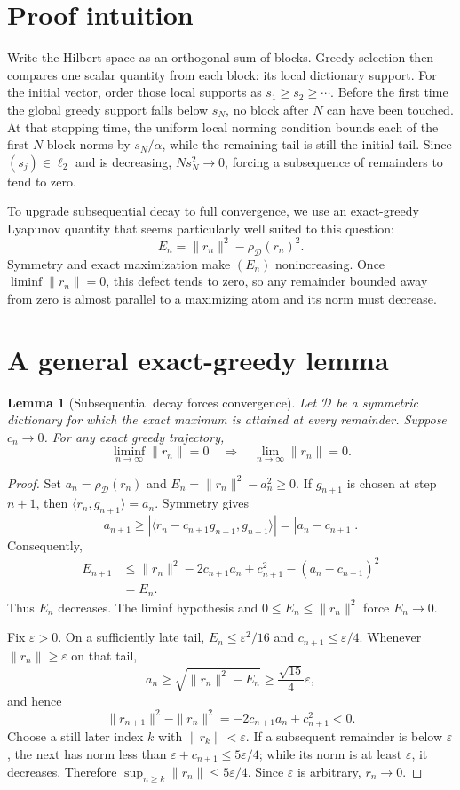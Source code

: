 \documentclass[11pt]{article}
\newtheorem{lemma}[theorem]{Lemma}
\newcommand{\D}{\mathcal D}
\newcommand{\rhoD}{\rho_{\mathcal D}}
\begin{document}
\section{Proof intuition}

Write the Hilbert space as an orthogonal sum of blocks.  Greedy selection then
compares one scalar quantity from each block: its local dictionary support.
For the initial vector, order those local supports as
$s_1\ge s_2\ge\cdots$.  Before the first time the global greedy support falls
below $s_N$, no block after $N$ can have been touched.  At that stopping time,
the uniform local norming condition bounds each of the first $N$ block norms
by $s_N/\alpha$, while the remaining tail is still the initial tail.  Since
$(s_j)\in\ell_2$ and is decreasing, $Ns_N^2\to0$, forcing a subsequence of
remainders to tend to zero.

To upgrade subsequential decay to full convergence, we use an exact-greedy
Lyapunov quantity that seems particularly well suited to this question:
\[
 E_n=\|r_n\|^2-\rhoD(r_n)^2.
\]
Symmetry and exact maximization make $(E_n)$ nonincreasing.  Once
$\liminf\|r_n\|=0$, this defect tends to zero, so any remainder bounded away
from zero is almost parallel to a maximizing atom and its norm must decrease.

\section{A general exact-greedy lemma}

\begin{lemma}[Subsequential decay forces convergence]\label{lem:upgrade}
Let $\D$ be a symmetric dictionary for which the exact maximum is attained at
every remainder.  Suppose $c_n\to0$.  For any exact greedy trajectory,
\[
 \liminf_{n\to\infty}\|r_n\|=0
 \quad\Longrightarrow\quad
 \lim_{n\to\infty}\|r_n\|=0.
\]
\end{lemma}

\begin{proof}
Set $a_n=\rhoD(r_n)$ and $E_n=\|r_n\|^2-a_n^2\ge0$.  If $g_{n+1}$ is chosen
at step $n+1$, then $\langle r_n,g_{n+1}\rangle=a_n$.  Symmetry gives
\[
 a_{n+1}\ge
 |\langle r_n-c_{n+1}g_{n+1},g_{n+1}\rangle|
 =|a_n-c_{n+1}|.
\]
Consequently,
\begin{align*}
 E_{n+1}
 &\le \|r_n\|^2-2c_{n+1}a_n+c_{n+1}^2
       -(a_n-c_{n+1})^2\\
 &=E_n.
\end{align*}
Thus $E_n$ decreases.  The liminf hypothesis and $0\le E_n\le\|r_n\|^2$
force $E_n\to0$.

Fix $\varepsilon>0$.  On a sufficiently late tail,
$E_n\le\varepsilon^2/16$ and $c_{n+1}\le\varepsilon/4$.  Whenever
$\|r_n\|\ge\varepsilon$ on that tail,
\[
 a_n\ge\sqrt{\|r_n\|^2-E_n}\ge\frac{\sqrt{15}}4\varepsilon,
\]
and hence
\[
 \|r_{n+1}\|^2-\|r_n\|^2
 =-2c_{n+1}a_n+c_{n+1}^2<0.
\]
Choose a still later index $k$ with $\|r_k\|<\varepsilon$.  If a subsequent
remainder is below $\varepsilon$, the next has norm less than
$\varepsilon+c_{n+1}\le5\varepsilon/4$; while its norm is at least
$\varepsilon$, it decreases.  Therefore
$\sup_{n\ge k}\|r_n\|\le5\varepsilon/4$.  Since $\varepsilon$ is arbitrary,
$r_n\to0$.
\end{proof}
\end{document}
